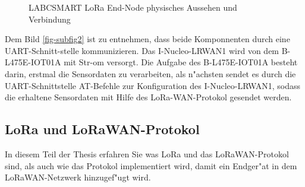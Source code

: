 \begin{figure}[h!]
	\centering
	\caption{LABCSMART LoRa End-Node physisches Aussehen  und Verbindung \label{fig:loranode}}
\end{figure}
\vspace{10cm}
Dem Bild \ref{fig-subfig2} ist zu entnehmen, dass beide Komponnenten durch eine UART-Schnitt-stelle kommunizieren. Das I-Nucleo-LRWAN1 wird von dem  B-L475E-IOT01A mit Str-om versorgt. Die Aufgabe des B-L475E-IOT01A besteht darin, erstmal die Sensordaten zu verarbeiten, als n"achsten sendet es durch die UART-Schnittstelle AT-Befehle zur Konfiguration des I-Nucleo-LRWAN1, sodass die erhaltene Sensordaten mit Hilfe des LoRa-WAN-Protokol gesendet werden. 
\vspace{1cm}

\subsection{LoRa und LoRaWAN-Protokol}\label{LoRaWAN_P}

In diesem Teil der Thesis erfahren Sie was LoRa und das LoRaWAN-Protokol sind, als auch wie das Protokol implementiert wird, damit ein Endger"at in dem LoRaWAN-Netzwerk hinzugef"ugt wird.

